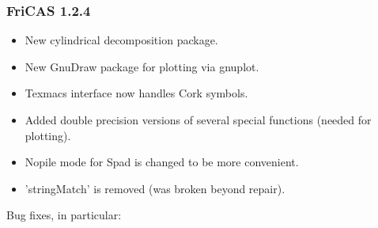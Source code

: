 \subsubsection{FriCAS 1.2.4}
\begin{itemize}

\item New cylindrical decomposition package.

\item New GnuDraw package for plotting via gnuplot.

\item Texmacs interface now handles Cork symbols.

\item Added double precision versions of several special functions
      (needed for plotting).

\item Nopile mode for Spad is changed to be more convenient.

\item 'stringMatch' is removed (was broken beyond repair).

\end{itemize}

Bug fixes, in particular:

